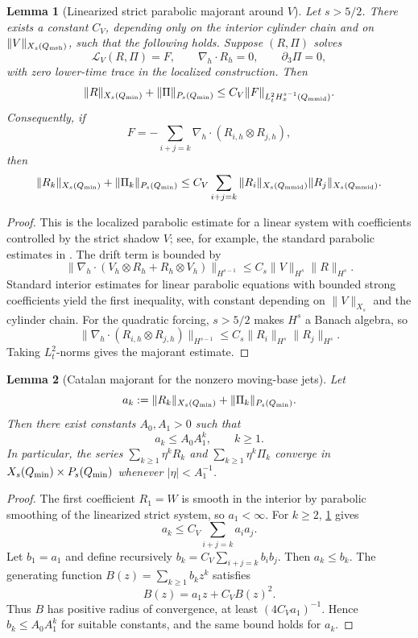 \documentclass[11pt]{article}
\numberwithin{equation}{section}
\theoremstyle{plain}
\newtheorem{lemma}{Lemma}[section]
\theoremstyle{definition}
\theoremstyle{remark}
\newcommand{\nabh}{\nabla_h}
\begin{document}
\begin{lemma}[Linearized strict parabolic majorant around \(V\)]
\label{pIII:lem:linearized-strict-majorant}
Let \(s>5/2\).  There exists a constant \(C_V\), depending only on the interior cylinder chain and
on \(\|V\|_{X_s(Q_{\rm msh})}\), such that the following holds.  Suppose \((R,\Pi)\) solves
\[
        \mathscr L_V(R,\Pi)=F,
        \qquad
        \nabh\cdot R_h=0,
        \qquad
        \partial_3\Pi=0,
\]
with zero lower-time trace in the localized construction.  Then
\[
        \|R\|_{X_s(Q_{\rm min})}+\|\Pi\|_{P_s(Q_{\rm min})}
        \le
        C_V\|F\|_{L^2_tH^{s-1}_x(Q_{\rm mmid})}.
\]
Consequently, if
\[
        F=-\sum_{i+j=k}\nabh\cdot(R_{i,h}\otimes R_{j,h}),
\]
then
\[
        \|R_k\|_{X_s(Q_{\rm min})}+\|\Pi_k\|_{P_s(Q_{\rm min})}
        \le
        C_V\sum_{i+j=k}\|R_i\|_{X_s(Q_{\rm mmid})}\|R_j\|_{X_s(Q_{\rm mmid})}.
\]
\end{lemma}

\begin{proof}
This is the localized parabolic estimate for a linear system with coefficients controlled by the
strict shadow \(V\); see, for example, the standard parabolic estimates in
\cite{Amann1995,Lunardi1995}.  The drift term is bounded by
\[
        \|\nabh\cdot(V_h\otimes R_h+R_h\otimes V_h)\|_{H^{s-1}}
        \le C_s\|V\|_{H^s}\|R\|_{H^s}.
\]
Standard interior estimates for linear parabolic equations with bounded strong coefficients yield the
first inequality, with constant depending on \(\|V\|_{X_s}\) and the cylinder chain.  For the
quadratic forcing, \(s>5/2\) makes \(H^s\) a Banach algebra, so
\[
        \|\nabh\cdot(R_{i,h}\otimes R_{j,h})\|_{H^{s-1}}
        \le C_s\|R_i\|_{H^s}\|R_j\|_{H^s}.
\]
Taking \(L^2_t\)-norms gives the majorant estimate.
\end{proof}

\begin{lemma}[Catalan majorant for the nonzero moving-base jets]
\label{pIII:lem:catalan-majorant-nonzero}
Let
\[
        a_k:=\|R_k\|_{X_s(Q_{\rm min})}+\|\Pi_k\|_{P_s(Q_{\rm min})}.
\]
Then there exist constants \(A_0,A_1>0\) such that
\[
        a_k\le A_0A_1^k,
        \qquad
        k\ge1.
\]
In particular, the series \(\sum_{k\ge1}\eta^kR_k\) and \(\sum_{k\ge1}\eta^k\Pi_k\) converge in
\(X_s(Q_{\rm min})\times P_s(Q_{\rm min})\) whenever \(|\eta|<A_1^{-1}\).
\end{lemma}

\begin{proof}
The first coefficient \(R_1=W\) is smooth in the interior by parabolic smoothing of the linearized
strict system, so \(a_1<\infty\).  For \(k\ge2\),
\cref{pIII:lem:linearized-strict-majorant} gives
\[
        a_k\le C_V\sum_{i+j=k}a_ia_j.
\]
Let \(b_1=a_1\) and define recursively \(b_k=C_V\sum_{i+j=k}b_ib_j\).  Then \(a_k\le b_k\).  The
generating function \(B(z)=\sum_{k\ge1}b_kz^k\) satisfies
\[
        B(z)=a_1z+C_VB(z)^2.
\]
Thus \(B\) has positive radius of convergence, at least \((4C_Va_1)^{-1}\).  Hence
\(b_k\le A_0A_1^k\) for suitable constants, and the same bound holds for \(a_k\).
\end{proof}
\end{document}
